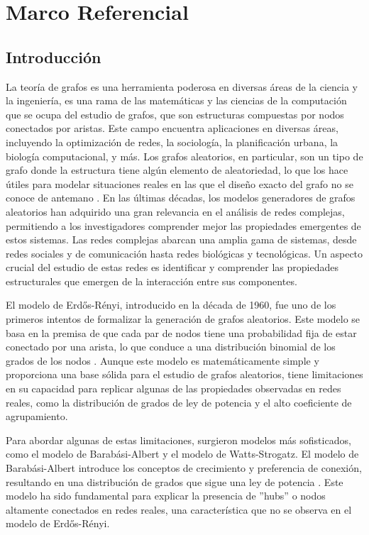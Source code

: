 \chapter{Marco Referencial}
\section{Introducción}
La teoría de grafos es una herramienta poderosa en diversas áreas de la ciencia y la ingeniería, es una rama de las matemáticas y las ciencias de la 
computación que se ocupa del estudio de grafos, que son estructuras compuestas por nodos conectados por aristas. Este campo encuentra aplicaciones en 
diversas áreas, incluyendo la optimización de redes, la sociología, la planificación urbana, la biología computacional, y más. Los grafos aleatorios, 
en particular, son un tipo de grafo donde la estructura tiene algún elemento de aleatoriedad, lo que los hace útiles para modelar situaciones reales en las que el diseño exacto del grafo no se conoce de antemano \citep{Newman2010}.
En las últimas décadas, los modelos generadores de grafos aleatorios han adquirido una gran relevancia en el análisis de redes complejas, permitiendo
 a los investigadores comprender mejor las propiedades emergentes de estos sistemas. Las redes complejas abarcan una amplia gama de sistemas, desde redes sociales y de comunicación hasta redes biológicas y tecnológicas. Un aspecto crucial del estudio de estas redes es identificar y comprender las propiedades estructurales que emergen de la interacción entre sus componentes.

El modelo de Erdős-Rényi, introducido en la década de 1960, fue uno de los primeros intentos de formalizar la generación de grafos aleatorios. 
Este modelo se basa en la premisa de que cada par de nodos tiene una probabilidad fija de estar conectado por una arista, lo que conduce a una distribución binomial de los grados de los nodos \citep{Erdos1959}. Aunque este modelo es matemáticamente simple y proporciona una base sólida para el estudio de grafos aleatorios, tiene limitaciones en su capacidad para replicar algunas de las propiedades observadas en redes reales, como la distribución de grados de ley de potencia y el alto coeficiente de agrupamiento.

Para abordar algunas de estas limitaciones, surgieron modelos más sofisticados, como el modelo de Barabási-Albert y el modelo de Watts-Strogatz. El modelo de Barabási-Albert introduce los conceptos de crecimiento y preferencia de conexión, resultando en una distribución de grados que sigue una ley de potencia \citep{Barabasi1999}. Este modelo ha sido fundamental para explicar la presencia de ''hubs'' o nodos altamente conectados en redes reales, una característica que no se observa en el modelo de Erdős-Rényi.

